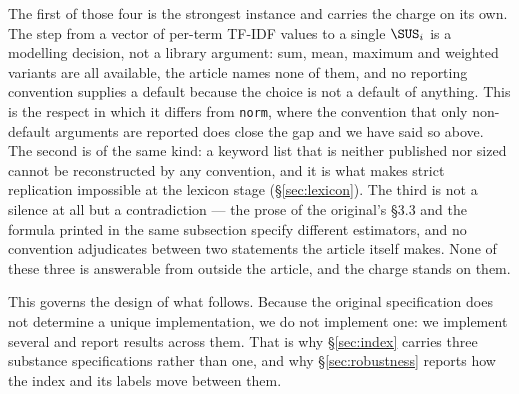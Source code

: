 The first of those four is the strongest instance and carries the charge on its own. The
step from a vector of per-term TF-IDF values to a single $\SUS_i$ is a modelling decision,
not a library argument: sum, mean, maximum and weighted variants are all available, the
article names none of them, and no reporting convention supplies a default because the
choice is not a default of anything. This is the respect in which it differs from
\texttt{norm}, where the convention that only non-default arguments are reported does close
the gap and we have said so above. The second is of the same kind: a keyword list that is
neither published nor sized cannot be reconstructed by any convention, and it is what makes
strict replication impossible at the lexicon stage (\S\ref{sec:lexicon}). The third is not a
silence at all but a contradiction --- the prose of the original's \S3.3 and the formula
printed in the same subsection specify different estimators, and no convention adjudicates
between two statements the article itself makes. None of these three is answerable from
outside the article, and the charge stands on them.

This governs the design of what follows. Because the original specification does not
determine a unique implementation, we do not implement one: we implement several and report
results across them. That is why \S\ref{sec:index} carries three substance specifications
rather than one, and why \S\ref{sec:robustness} reports how the index and its labels move
between them.
